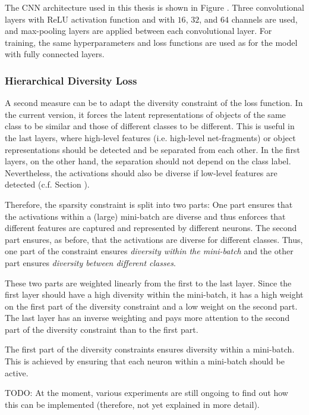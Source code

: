 The CNN architecture used in this thesis is shown in Figure .
Three convolutional layers with ReLU activation function and with $16$, $32$, and $64$ channels are used, and max-pooling layers are applied between each convolutional layer. For training, the same hyperparameters and loss functions are used as for the model with fully connected layers.

\subsubsection{Hierarchical Diversity Loss}
A second measure can be to adapt the diversity constraint of the loss function. In the current version, it forces the latent representations of objects of the same class to be similar and those of different classes to be different. This is useful in the last layers, where high-level features (i.e. high-level net-fragments) or object representations should be detected and be separated from each other. In the first layers, on the other hand, the separation should not depend on the class label. Nevertheless, the activations should also be diverse if low-level features are detected (c.f. Section ).

Therefore, the sparsity constraint is split into two parts: One part ensures that the activations within a (large) mini-batch are diverse and thus enforces that different features are captured and represented by different neurons. The second part ensures, as before, that the activations are diverse for different classes. Thus, one part of the constraint ensures \emph{diversity within the mini-batch} and the other part ensures \emph{diversity between different classes}.

These two parts are weighted linearly from the first to the last layer. Since the first layer should have a high diversity within the mini-batch, it has a high weight on the first part of the diversity constraint and a low weight on the second part. The last layer has an inverse weighting and pays more attention to the second part of the diversity constraint than to the first part.

The first part of the diversity constraints ensures diversity within a mini-batch. This is achieved by ensuring that each neuron within a mini-batch should be active. 

TODO: At the moment, various experiments are still ongoing to find out how this can be implemented (therefore, not yet explained in more detail).


